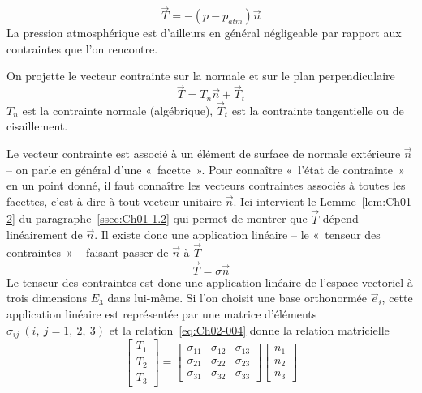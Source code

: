 \begin{equation}
    \vec{T} = -\left( p - p_{atm} \right) \vec{n}
    \label{eq:Ch02-002}
\end{equation}
La pression atmosphérique est d'ailleurs en général négligeable par rapport aux contraintes que l'on rencontre.

On projette le vecteur contrainte sur la normale et sur le plan perpendiculaire
\begin{equation}
    \vec{T} = T_{n}\vec{n} + \vec{T}_{t}
    \label{eq:Ch02-003}
\end{equation}
$T_n$ est la contrainte normale (algébrique), $\vec{T}_t$ est la contrainte tangentielle ou de cisaillement. 

Le vecteur contrainte est associé à un élément de surface de normale extérieure $\vec{n}$ -- on parle en général d'une «~facette~». 
Pour connaître «~l'état de contrainte~» en un point donné, il faut connaître les vecteurs contraintes associés à toutes les facettes, c'est à dire à tout vecteur unitaire $\vec{n}$.
Ici intervient le Lemme~\ref{lem:Ch01-2} du paragraphe~\ref{ssec:Ch01-1.2} qui permet de montrer que $\vec{T}$ dépend linéairement de $\vec{n}$.
Il existe donc une application linéaire -- le «~tenseur des contraintes~» -- faisant passer de $\vec{n}$ à $\vec{T}$
\begin{equation}
    \vec{T} = \mathbb{\sigma} \vec{n}
    \label{eq:Ch02-004}
\end{equation}
Le tenseur des contraintes est donc une application linéaire de l'espace vectoriel à trois dimensions $E_3$ dans lui-même.
Si l'on choisit une base orthonormée $\vec{e}_i$, cette application linéaire est représentée par une matrice d'éléments $\sigma_{ij}\ (i,\ j = 1,\ 2,\ 3)$  et la relation~\eqref{eq:Ch02-004} donne la relation matricielle
\begin{equation*}
    \begin{bmatrix}
        T_1\\
        T_2\\
        T_3
    \end{bmatrix}
    =
    \begin{bmatrix}
        \sigma_{11} & \sigma_{12} & \sigma_{13}\\
        \sigma_{21} & \sigma_{22} & \sigma_{23}\\
        \sigma_{31} & \sigma_{32} & \sigma_{33}
    \end{bmatrix}
    \begin{bmatrix}
        n_1\\
        n_2\\
        n_3
    \end{bmatrix}
\end{equation*}
